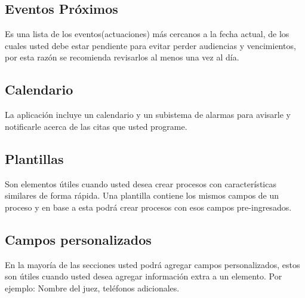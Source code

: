 \subsection{Eventos Pr\'oximos}
Es una lista de los eventos(actuaciones) m\'as cercanos a la fecha actual, de los cuales usted debe estar pendiente para evitar perder audiencias y vencimientos, por esta raz\'on se recomienda revisarlos al menos una vez al d\'ia.

\subsection{Calendario}
La aplicaci\'on incluye un calendario y un subistema de alarmas para avisarle y notificarle acerca de las citas que usted programe.

\subsection{Plantillas}
Son elementos \'utiles cuando usted desea crear procesos con
caracter\'isticas similares de forma r\'apida. Una plantilla contiene los mismos
campos de un proceso y en base a esta podr\'a crear procesos con esos campos
pre-ingresados.

\subsection{Campos personalizados}
En la mayor\'ia de las secciones usted podr\'a agregar campos personalizados, estos son
\'utiles cuando usted desea agregar informaci\'on extra a un elemento. Por
ejemplo: Nombre del juez, tel\'efonos adicionales.
